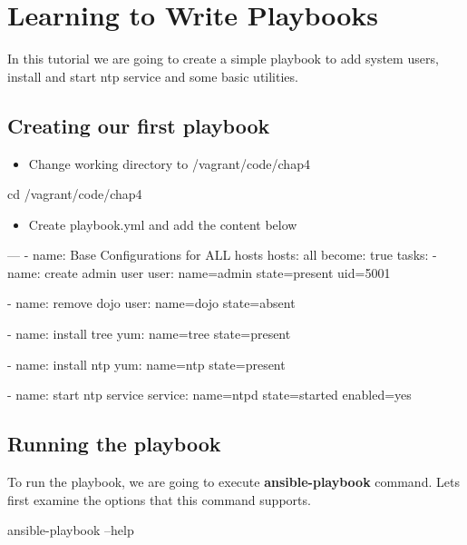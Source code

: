 \chapter{Learning to Write Playbooks}

In this tutorial we are going to create a simple playbook to add system users, install and start ntp service and some basic utilities.

\section{Creating our first playbook}

\begin{itemize}
\item Change working directory to /vagrant/code/chap4
\end{itemize}

\begin{code}
cd /vagrant/code/chap4
\end{code}

\begin{itemize}
\item Create playbook.yml and add the content below
\end{itemize}

\begin{code}
---
  - name: Base Configurations for ALL hosts
    hosts: all
    become: true
    tasks:
      - name: create admin user
        user: name=admin state=present uid=5001

      - name: remove dojo
        user: name=dojo  state=absent

      - name: install tree
        yum:  name=tree  state=present

      - name: install ntp
        yum:  name=ntp   state=present

      - name: start ntp service
        service: name=ntpd state=started enabled=yes
\end{code}

\section{Running the  playbook}

To run the playbook, we are going to execute \textbf{ansible-playbook} command. Lets first examine the options that this command supports.

\begin{code}
ansible-playbook --help
\end{code}


